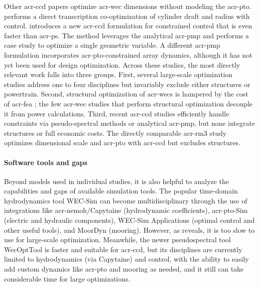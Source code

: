     Other \gls{acr-ccd} papers optimize \gls{acr-wec} dimensions without modeling the \gls{acr-pto}.
    \citet{herber_dynamic_2014} performs a direct transcription co-optimization of cylinder draft and radius with control.
    \citet{lin_fast_2025} introduces a new \gls{acr-ccd} formulation for constrained control that is even faster than \gls{acr-ps}.
    The method leverages the analytical \gls{acr-pmp} and performs a case study to optimize a single geometric variable.
    A different \gls{acr-pmp} formulation \citep{abdulkadir_optimal_2024} incorporates \gls{acr-pto}-constrained array dynamics, although it has not yet been used for design optimization.
\else
    Across these studies, the most directly relevant work falls into three groups.
    First, several large-scale optimization studies \citep{gaudin_single_2021,khanal_multi-objective_2024,edwards_optimisation_2022,garcia-teruel_reliability-based_2021,garcia-teruel_design_2022,cotten_multi-objective_2022} address one to four disciplines but invariably exclude either structures or powertrain.
    Second, structural optimization of \glspl{acr-wec} is hampered by the cost of \gls{acr-fea} \citep{coe_survey_2018,ove_arup__partners_ltd_structural_2016,paduano_towards_2024,giannini_wave_2022}; the few \gls{acr-wec} studies that perform structural optimization \citep{an_optimal_2024,ambuhl_reliability-based_2014} decouple it from power calculations.
    Third, recent \gls{acr-ccd} studies \citep{rosati_control_2023,son_performance_2016,gaebele_tpl_2025,devin_high-dimensional_2024,grasberger_control_2024,herber_dynamic_2014,lin_fast_2025,abdulkadir_optimal_2024} efficiently handle constraints via pseudo-spectral methods or analytical \gls{acr-pmp}, but none integrate structures or full economic costs.
    The directly comparable \gls{acr-rm3} study \citep{gaebele_tpl_2025} optimizes dimensional scale and \gls{acr-pto} with \gls{acr-ccd} but excludes structures.
\fi

\paragraph{Software tools and gaps}
\ifdefined\DISSERTATION
    Beyond models used in individual studies, it is also helpful to analyze the capabilities and gaps of available simulation tools.
    The popular time-domain hydrodynamics tool WEC-Sim \citep{ruehl_wec-simwec-sim_2024} can become multidisciplinary through the use of integrations like \gls{acr-nemoh}/Capytaine (hydrodynamic coefficients), \gls{acr-pto}-Sim (electric and hydraulic components), WEC-Sim Applications (optimal control and other useful tools), and MoorDyn (mooring).
    However, as \citep{housner_numerical_2024} reveals, it is too slow to use for large-scale optimization.
    Meanwhile, the newer pseudospectral tool WecOptTool \citep{coe_initial_2020} is faster and suitable for \gls{acr-ccd}, but its disciplines are currently limited to hydrodynamics (via Capytaine) and control, with the ability to easily add custom dynamics like \gls{acr-pto} and mooring as needed, and it still can take considerable time for large optimizations.

